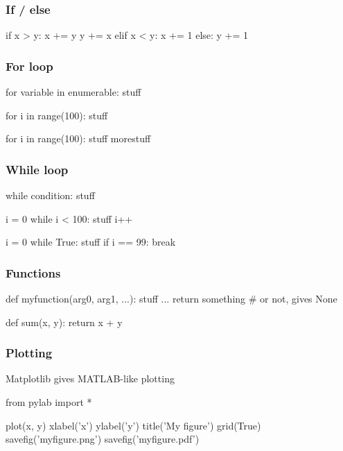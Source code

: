 \begin{frame}[fragile]
  \frametitle{If / else}

\begin{python}
if x > y:
    x += y
    y += x
elif x < y:
    x += 1
else:
    y += 1
\end{python}

\end{frame}

\begin{frame}[fragile]
  \frametitle{For loop}

\begin{python}
for variable in enumerable:
    stuff

for i in range(100):
    stuff

for i in range(100):
    stuff
    morestuff
\end{python}

\end{frame}

\begin{frame}[fragile]
  \frametitle{While loop}

\begin{python}
while condition:
    stuff

i = 0
while i < 100:
    stuff
    i++

i = 0
while True:
    stuff
    if i == 99:
        break
\end{python}

\end{frame}

\begin{frame}[fragile]
  \frametitle{Functions}

\begin{python}
def myfunction(arg0, arg1, ...):
    stuff
    ...
    return something # or not, gives None

def sum(x, y):
    return x + y
\end{python}

\end{frame}

\begin{frame}[fragile]
  \frametitle{Plotting}

  Matplotlib gives MATLAB-like plotting

\begin{python}
from pylab import *

plot(x, y)
xlabel('x')
ylabel('y')
title('My figure')
grid(True)
savefig('myfigure.png')
savefig('myfigure.pdf')
\end{python}

\end{frame}

